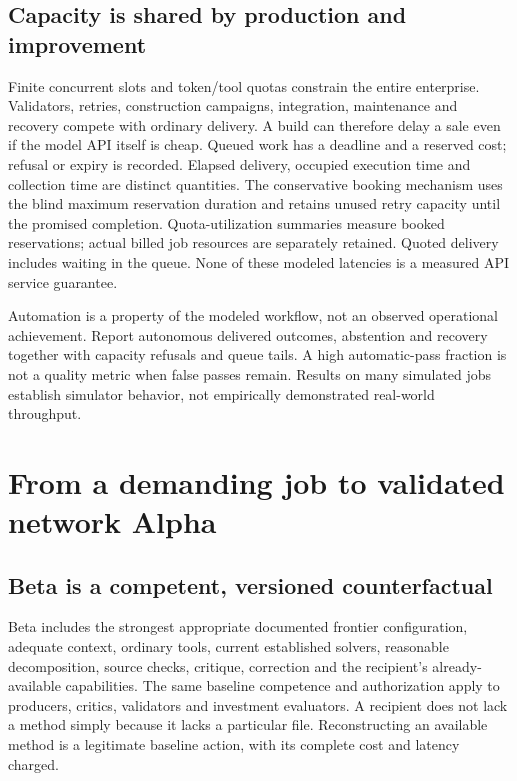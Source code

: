 \documentclass[11pt,a4paper]{article}
\begin{document}
\subsection{Capacity is shared by production and improvement}

Finite concurrent slots and token/tool quotas constrain the entire enterprise. Validators, retries, construction campaigns, integration, maintenance and recovery compete with ordinary delivery. A build can therefore delay a sale even if the model API itself is cheap. Queued work has a deadline and a reserved cost; refusal or expiry is recorded. Elapsed delivery, occupied execution time and collection time are distinct quantities. The conservative booking mechanism uses the blind maximum reservation duration and retains unused retry capacity until the promised completion. Quota-utilization summaries measure booked reservations; actual billed job resources are separately retained. Quoted delivery includes waiting in the queue. None of these modeled latencies is a measured API service guarantee.

Automation is a property of the modeled workflow, not an observed operational achievement. Report autonomous delivered outcomes, abstention and recovery together with capacity refusals and queue tails. A high automatic-pass fraction is not a quality metric when false passes remain. Results on many simulated jobs establish simulator behavior, not empirically demonstrated real-world throughput.

\section{From a demanding job to validated network Alpha}

\subsection{Beta is a competent, versioned counterfactual}

Beta includes the strongest appropriate documented frontier configuration, adequate context, ordinary tools, current established solvers, reasonable decomposition, source checks, critique, correction and the recipient's already-available capabilities. The same baseline competence and authorization apply to producers, critics, validators and investment evaluators. A recipient does not lack a method simply because it lacks a particular file. Reconstructing an available method is a legitimate baseline action, with its complete cost and latency charged.
\end{document}
